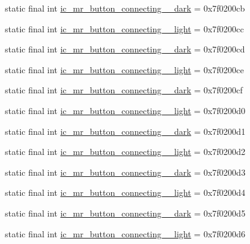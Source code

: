 \begin{CompactItemize}
\item 
static final int \hyperlink{classandroid_1_1support_1_1v4_1_1_r_1_1drawable_78fedbef45bcf5b42d70bb18ae97d33c}{ic\_\-mr\_\-button\_\-connecting\_\_\-dark} = 0x7f0200cb
\item 
static final int \hyperlink{classandroid_1_1support_1_1v4_1_1_r_1_1drawable_9d3a9e1de5acf3abe2d72e09278629b1}{ic\_\-mr\_\-button\_\-connecting\_\_\-light} = 0x7f0200cc
\item 
static final int \hyperlink{classandroid_1_1support_1_1v4_1_1_r_1_1drawable_c97e6fd32ce4e2cddcfac0a0bcdbf9cb}{ic\_\-mr\_\-button\_\-connecting\_\_\-dark} = 0x7f0200cd
\item 
static final int \hyperlink{classandroid_1_1support_1_1v4_1_1_r_1_1drawable_955146ee025c82d0b1fb168be02b06ce}{ic\_\-mr\_\-button\_\-connecting\_\_\-light} = 0x7f0200ce
\item 
static final int \hyperlink{classandroid_1_1support_1_1v4_1_1_r_1_1drawable_98e59f46a7904f33b340d78602a7e5ee}{ic\_\-mr\_\-button\_\-connecting\_\_\-dark} = 0x7f0200cf
\item 
static final int \hyperlink{classandroid_1_1support_1_1v4_1_1_r_1_1drawable_07e734766b920c5d08eb5c2ed9072ee7}{ic\_\-mr\_\-button\_\-connecting\_\_\-light} = 0x7f0200d0
\item 
static final int \hyperlink{classandroid_1_1support_1_1v4_1_1_r_1_1drawable_ce8c79d7fb14ed0194a8ccd175ab2fac}{ic\_\-mr\_\-button\_\-connecting\_\_\-dark} = 0x7f0200d1
\item 
static final int \hyperlink{classandroid_1_1support_1_1v4_1_1_r_1_1drawable_df23d0e021f437567ca4634631641850}{ic\_\-mr\_\-button\_\-connecting\_\_\-light} = 0x7f0200d2
\item 
static final int \hyperlink{classandroid_1_1support_1_1v4_1_1_r_1_1drawable_f4d442d3b2f9fc277ec216611d254a9c}{ic\_\-mr\_\-button\_\-connecting\_\_\-dark} = 0x7f0200d3
\item 
static final int \hyperlink{classandroid_1_1support_1_1v4_1_1_r_1_1drawable_901035557c84491c4e91019c221492fd}{ic\_\-mr\_\-button\_\-connecting\_\_\-light} = 0x7f0200d4
\item 
static final int \hyperlink{classandroid_1_1support_1_1v4_1_1_r_1_1drawable_78d0ffaf9a2b73c7aaea167ee34f1d08}{ic\_\-mr\_\-button\_\-connecting\_\_\-dark} = 0x7f0200d5
\item 
static final int \hyperlink{classandroid_1_1support_1_1v4_1_1_r_1_1drawable_2aef957f8583a0bfad36080b4ca53dd3}{ic\_\-mr\_\-button\_\-connecting\_\_\-light} = 0x7f0200d6

\end{CompactItemize}
